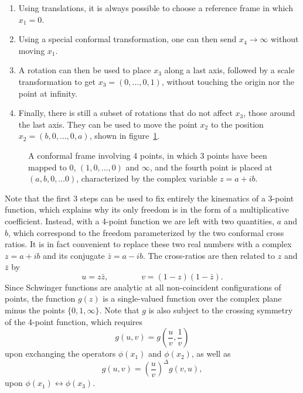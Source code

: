 \documentclass[a4paper,12pt]{article}
\numberwithin{equation}{section}
\begin{document}
\begin{enumerate}

\item
Using translations, it is always possible to choose a reference frame in which $x_1 = 0$.

\item
Using a special conformal transformation, one can then send $x_4 \to \infty$ without moving $x_1$.

\item
A rotation can then be used to place $x_3$ along a last axis, followed by a scale transformation to get $x_3 = (0, \ldots, 0, 1)$, without touching the origin nor the point at infinity.

\item
Finally, there is still a subset of rotations that do not affect $x_3$, those around the last axis. They can be used to move the point $x_2$ to the position $x_2 = (b, 0, \ldots, 0, a)$, shown in figure~\ref{fig:conformalframe:z}.

\end{enumerate}
%
\begin{figure}
	\centering
	\caption{A conformal frame involving 4 points, in which 3 points
	have been mapped to $0$, $(1, 0, \ldots, 0)$ and $\infty$,
	and the fourth point is placed at $(a, b, 0, \ldots 0)$,
	characterized by the complex variable $z = a + i b$.
	}
	\label{fig:conformalframe:z}
\end{figure}
%
Note that the first 3 steps can be used to fix entirely the kinematics of a 3-point function, which explains why its only freedom is in the form of a multiplicative coefficient. Instead, with a 4-point function we are left with two quantities, $a$ and $b$, which correspond to the freedom parameterized by the two conformal cross ratios.
It is in fact convenient to replace these two real numbers with a complex $z = a + i b$ and its conjugate $\bar{z} = a - i b$.
The cross-ratios are then related to $z$ and $\bar{z}$ by
\begin{equation}
	u = z \bar{z},
	\qquad\qquad
	v = (1 - z) (1 - \bar{z}).
\end{equation}
Since Schwinger functions are analytic at all non-coincident configurations of points, the function $g(z)$ is a single-valued function over the complex plane minus the points $\{ 0, 1, \infty \}$. Note that $g$ is also subject to the crossing symmetry of the 4-point function, which requires
\begin{equation}
	g(u, v) =
	g\left( \frac{u}{v}, \frac{1}{v} \right)
\end{equation}
upon exchanging the operators $\phi(x_1)$ and $\phi(x_2)$, as well as
\begin{equation}
	g(u,v) = \left( \frac{u}{v} \right)^\Delta g(v, u),
\end{equation}
upon $\phi(x_1) \leftrightarrow \phi(x_3)$.
\end{document}

